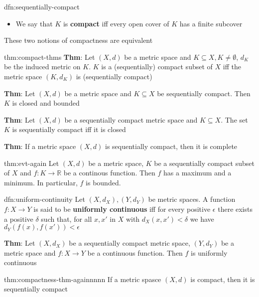 \documentclass[landscape, 8pt]{extarticle}
\begin{document}
\begin{multicols}{3}
\begin{dfn}{dfn:sequentially-compact}{}
\begin{itemize}[leftmargin=*]
        \item We say that $K$ is \textbf{compact} iff every open cover of $K$ has a finite subcover
    \end{itemize}

    These two notions of compactness are equivalent
\end{dfn}

\begin{thm}{thm:compact-thms}{}
    \textbf{Thm}: Let $(X, d)$ be a metric space and $K \subseteq X, K\ne\emptyset$, $d_{K}$ be the induced metric on $K$. $K$ is a (sequentially) compact subset of $X$ iff the metric space $(K, d_{K})$ is (sequentially compact)

    \longrule{0.08ex}
    \textbf{Thm}: Let $(X, d)$ be a metric space and $K \subseteq X$ be sequentially compact. Then $K$ is closed and bounded

    \longrule{0.08ex}
    \textbf{Thm}: Let $(X, d)$ be a sequentially compact metric space and $K \subseteq X$. The set $K$ is sequentially compact iff it is closed

    \longrule{0.08ex}
    \textbf{Thm}: If a metric space $(X, d)$ is sequentially compact, then it is complete
\end{thm}

\begin{thm}{thm:evt-again}{}
    Let $(X, d)$ be a metric space, $K$ be a sequentially compact subset of $X$ and $f : K \to \mathbb{R}$ be a continous function. Then $f$ has a maximum and a minimum. In particular, $f$ is bounded.
\end{thm}

\begin{dfn}{dfn:uniform-continuity}{}
    Let $(X, d_{X}), (Y, d_{Y})$ be metric spaces. A function $f : X \to Y$ is said to be \textbf{uniformly continuous} iff for every positive $\epsilon$ there exists a positive $\delta$ such that, for all $x, x'$ in $X$ with $d_{X}(x, x') < \delta$ we have $d_{Y}(f(x), f(x')) < \epsilon$

    \longrule{0.08ex}
    \textbf{Thm}: Let $(X, d_{X})$ be a sequentially compact metric space, $(Y, d_{Y})$ be a metric space and $f : X\to Y$ be a continuous function. Then $f$ is uniformly continuous
\end{dfn}

\begin{thm}{thm:compactness-thm-againnnnn}{}
    If a metric spasce $(X, d)$ is compact, then it is sequentially compact


\end{thm}
\end{multicols}
\end{document}
